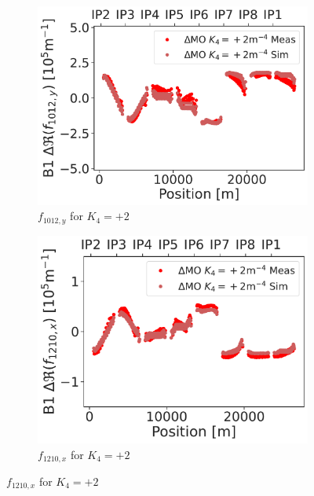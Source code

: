 \begin{figure}[!htb]
    \par\medskip 
    \begin{subfigure}{0.47\textwidth}
        \includegraphics[width=\textwidth]{./images/skew_octupoles/responses_coupling/f1012_response_meas_sim_+2_REAL.pdf}
        \caption{$f_{1012,y}$ for $K_4 = +2$}
    \end{subfigure}
    \hfill
    \begin{subfigure}{0.47\textwidth}
        \includegraphics[width=\textwidth]{./images/skew_octupoles/responses_coupling/f1210_response_meas_sim_+2_REAL.pdf}
        \caption{$f_{1210,x}$ for $K_4 = +2$}
    \end{subfigure}
    \par\medskip 

\end{figure}
